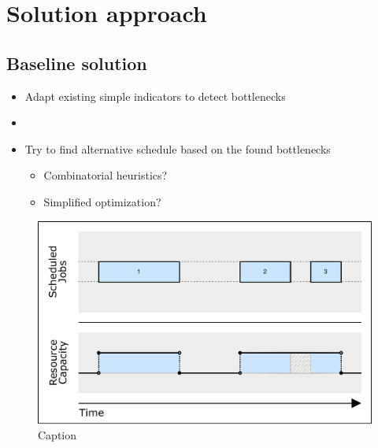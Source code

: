 \chapter{Solution approach}

\section{Baseline solution}

\begin{itemize}
    \item Adapt existing simple indicators to detect bottlenecks

    \item {}    

    \item Try to find alternative schedule based on the found bottlenecks
    \begin{itemize}
        \item Combinatorial heuristics?
        \item Simplified optimization?
    \end{itemize}
\end{itemize}

\begin{figure}[p]\centering
\includegraphics[width=\textwidth]{img/Capacities-JobShop.pdf}
\caption{Caption}
\end{figure}

